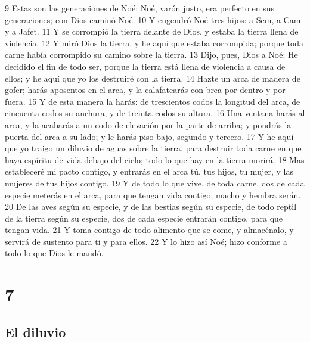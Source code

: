 9 Estas son las generaciones de Noé: Noé, varón justo, era perfecto en sus generaciones; con Dios caminó Noé.
10 Y engendró Noé tres hijos: a Sem, a Cam y a Jafet.
11 Y se corrompió la tierra delante de Dios, y estaba la tierra llena de violencia.
12 Y miró Dios la tierra, y he aquí que estaba corrompida; porque toda carne había corrompido su camino sobre la tierra.
13 Dijo, pues, Dios a Noé: He decidido el fin de todo ser, porque la tierra está llena de violencia a causa de ellos; y he aquí que yo los destruiré con la tierra.
14 Hazte un arca de madera de gofer; harás aposentos en el arca, y la calafatearás con brea por dentro y por fuera.
15 Y de esta manera la harás: de trescientos codos la longitud del arca, de cincuenta codos su anchura, y de treinta codos su altura.
16 Una ventana harás al arca, y la acabarás a un codo de elevación por la parte de arriba; y pondrás la puerta del arca a su lado; y le harás piso bajo, segundo y tercero.
17 Y he aquí que yo traigo un diluvio de aguas sobre la tierra, para destruir toda carne en que haya espíritu de vida debajo del cielo; todo lo que hay en la tierra morirá.
18 Mas estableceré mi pacto contigo, y entrarás en el arca tú, tus hijos, tu mujer, y las mujeres de tus hijos contigo.
19 Y de todo lo que vive, de toda carne, dos de cada especie meterás en el arca, para que tengan vida contigo; macho y hembra serán.
20 De las aves según su especie, y de las bestias según su especie, de todo reptil de la tierra según su especie, dos de cada especie entrarán contigo, para que tengan vida.
21 Y toma contigo de todo alimento que se come, y almacénalo, y servirá de sustento para ti y para ellos.
22 Y lo hizo así Noé; hizo conforme a todo lo que Dios le mandó.

\chapter{7}

\section{El diluvio}


